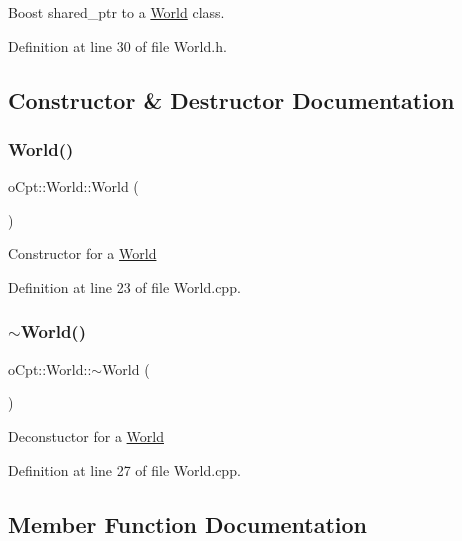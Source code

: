 Boost shared\+\_\+ptr to a \hyperlink{classo_cpt_1_1_world}{World} class. 



Definition at line 30 of file World.\+h.



\subsection{Constructor \& Destructor Documentation}
\hypertarget{classo_cpt_1_1_world_adc3d3e562ec4f5979b8da40bf8bef36c}{}\label{classo_cpt_1_1_world_adc3d3e562ec4f5979b8da40bf8bef36c} 
\subsubsection{\texorpdfstring{World()}{World()}}
{\footnotesize\ttfamily o\+Cpt\+::\+World\+::\+World (\begin{DoxyParamCaption}{ }\end{DoxyParamCaption})}

Constructor for a \hyperlink{classo_cpt_1_1_world}{World} 

Definition at line 23 of file World.\+cpp.

\hypertarget{classo_cpt_1_1_world_a74dd3c254805c7dd16353b7b7e93dc45}{}\label{classo_cpt_1_1_world_a74dd3c254805c7dd16353b7b7e93dc45} 
\subsubsection{\texorpdfstring{$\sim$\+World()}{~World()}}
{\footnotesize\ttfamily o\+Cpt\+::\+World\+::$\sim$\+World (\begin{DoxyParamCaption}{ }\end{DoxyParamCaption})\hspace{0.3cm}{\ttfamily [virtual]}}

Deconstuctor for a \hyperlink{classo_cpt_1_1_world}{World} 

Definition at line 27 of file World.\+cpp.



\subsection{Member Function Documentation}
\hypertarget{classo_cpt_1_1_world_a505f4c14270cfd34d806bd04c4b67f95}{}\label{classo_cpt_1_1_world_a505f4c14270cfd34d806bd04c4b67f95} 
